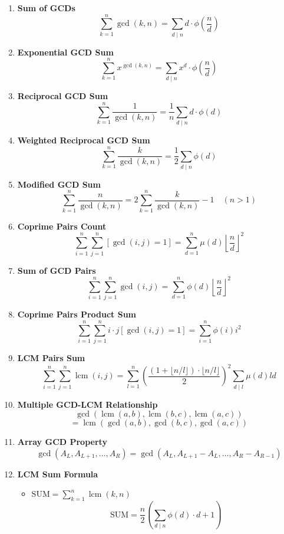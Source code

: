 \documentclass[twoside]{article}
\begin{document}
\begin{multicols*}{2}
\begin{enumerate}[leftmargin=*]
    \item \textbf{Sum of GCDs}
        \[\sum_{k=1}^n \gcd(k, n) = \sum_{d \mid n} d \cdot \phi\left(\frac{n}{d}\right)\]
    
    \item \textbf{Exponential GCD Sum}
        \[\sum_{k=1}^n x^{\gcd(k,n)} = \sum_{d \mid n} x^d \cdot \phi\left(\frac{n}{d}\right)\]
    
    \item \textbf{Reciprocal GCD Sum}
        \[\sum_{k=1}^n \frac{1}{\gcd(k, n)} = \frac{1}{n} \sum_{d \mid n} d \cdot \phi(d)\]
    
    \item \textbf{Weighted Reciprocal GCD Sum}
        \[\sum_{k=1}^n \frac{k}{\gcd(k, n)} = \frac{1}{2} \sum_{d \mid n} \phi(d)\]
    
    \item \textbf{Modified GCD Sum}
        \[\sum_{k=1}^n \frac{n}{\gcd(k, n)} = 2 \sum_{k=1}^n \frac{k}{\gcd(k, n)} - 1 \quad (n > 1)\]
    
    \item \textbf{Coprime Pairs Count}
        \[\sum_{i=1}^n \sum_{j=1}^n [\gcd(i, j) = 1] = \sum_{d=1}^n \mu(d) \left\lfloor \frac{n}{d} \right\rfloor^2\]
    
    \item \textbf{Sum of GCD Pairs}
        \[\sum_{i=1}^n \sum_{j=1}^n \gcd(i, j) = \sum_{d=1}^n \phi(d) \left\lfloor \frac{n}{d} \right\rfloor^2\]
    
    \item \textbf{Coprime Pairs Product Sum}
        \[\sum_{i=1}^n \sum_{j=1}^n i \cdot j[\gcd(i, j) = 1] = \sum_{i=1}^n \phi(i)i^2\]
    
    \item \textbf{LCM Pairs Sum}
        \[\sum_{i=1}^n \sum_{j=1}^n \operatorname{lcm}(i, j) = \sum_{l=1}^n \left(\frac{(1 + \lfloor n/l \rfloor) \cdot \lfloor n/l \rfloor}{2} \right)^2 \sum_{d \mid l} \mu(d)ld\]
    
    \item \textbf{Multiple GCD-LCM Relationship}
        \[\gcd(\operatorname{lcm}(a, b), \operatorname{lcm}(b, c), \operatorname{lcm}(a, c))\]
        \[= \operatorname{lcm}(\gcd(a, b), \gcd(b, c), \gcd(a, c))\]
    
    \item \textbf{Array GCD Property}
        \[\gcd(A_L, A_{L+1}, \ldots, A_R) = \gcd(A_L, A_{L+1} - A_L, \ldots, A_R - A_{R-1})\]
    
    \item \textbf{LCM Sum Formula}
        \begin{itemize}
            \item $\text{SUM} = \sum_{k=1}^n \operatorname{lcm}(k,n)$
            \[\text{SUM} = \frac{n}{2} \left( \sum_{d \mid n} \phi(d) \cdot d + 1 \right)\]
        \end{itemize}
\end{enumerate}


\end{multicols*}
\end{document}
